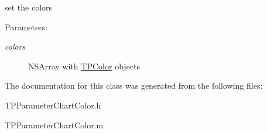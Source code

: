 set the colors \begin{Desc}
\item[Parameters:]
\begin{description}
\item[{\em colors}]NSArray with \hyperlink{interface_t_p_color}{TPColor} objects \end{description}
\end{Desc}


The documentation for this class was generated from the following files:\begin{CompactItemize}
\item 
TPParameterChartColor.h\item 
TPParameterChartColor.m\end{CompactItemize}

